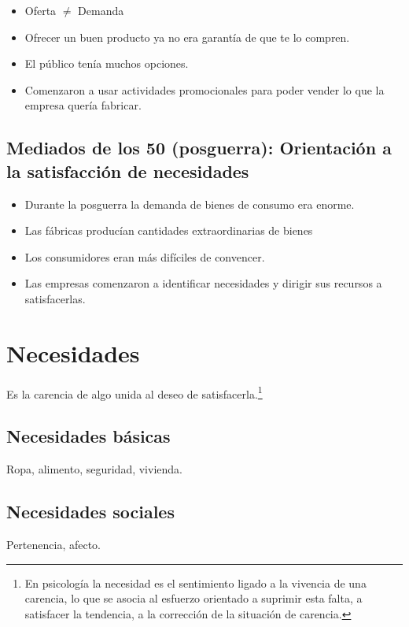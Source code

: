 \documentclass[12pt, spanish, a5paper]{article}
\begin{document}
\begin{itemize}
	\item Oferta $\neq$ Demanda
	\item Ofrecer un buen producto ya no era garantía de que te lo compren.
	\item El público tenía muchos opciones.
	\item Comenzaron a usar actividades promocionales para poder vender lo que la empresa quería fabricar.
\end{itemize}

\subsection{Mediados de los 50 (posguerra): Orientación a la satisfacción de necesidades}

\begin{itemize}
	\item Durante la posguerra la demanda de bienes de consumo era enorme.
	\item Las fábricas producían cantidades extraordinarias de bienes
	\item Los consumidores eran más difíciles de convencer.
	\item Las empresas comenzaron a identificar necesidades y dirigir sus recursos a satisfacerlas.
	
\end{itemize}



\section{Necesidades}

Es la carencia de algo unida al deseo de satisfacerla.\footnote{En psicología la necesidad es el sentimiento ligado a la vivencia de una carencia, lo que se asocia al esfuerzo orientado a suprimir esta falta, a satisfacer la tendencia, a la corrección de la situación de carencia.\cite{necesidad}}

\subsection{Necesidades básicas}

Ropa, alimento, seguridad, vivienda.

\subsection{Necesidades sociales}
Pertenencia, afecto.
\end{document}
